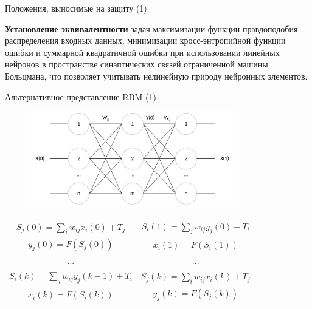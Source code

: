 \documentclass[10pt]{beamer}
\begin{document}
        \begin{frame}{Положения, выносимые на защиту (1)}
            \begin{block}{1}
                \large
                \textbf{Установление эквивалентности} задач максимизации функции правдоподобия распределения входных данных, минимизации кросс-энтропийной функции ошибки и суммарной квадратичной ошибки при использовании линейных нейронов в пространстве синаптических связей ограниченной машины Больцмана, что позволяет учитывать нелинейную природу нейронных элементов.
            \end{block}
        \end{frame}

        \begin{frame}{Альтернативное представление RBM (1)}
            \begin{figure}[H]
                \centering
                \includegraphics[width=0.8\textwidth]{pic2-1.pdf}
            \end{figure}
            \begin{center}
                \begin{tabular}{c|c}
                    $S_j(0)=\sum_i w_{ij}x_i(0)+T_j$ & $S_i(1)=\sum_j w_{ij}y_j(0)+T_i$ \\
                    $y_j(0)=F(S_j(0))$ &
                    $x_i(1)=F(S_i(1))$
                    \\
                    \hline
                    ... & ...\\
                    \hline
                    $S_i(k)=\sum_j w_{ij}y_j(k-1)+T_i$ & $S_j(k)=\sum_i w_{ij}x_i(k)+T_j$ \\
                    $x_i(k)=F(S_i(k))$ &
                    $y_j(k)=F(S_j(k))$
                \end{tabular}
            \end{center}
        \end{frame}
\end{document}
